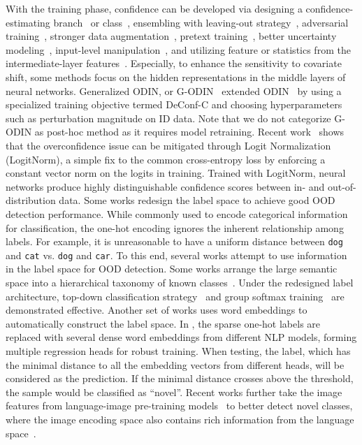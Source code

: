 With the training phase, confidence can be developed via designing a confidence-estimating branch~ or class~, ensembling with leaving-out strategy~, adversarial training~, stronger data augmentation~, pretext training~, better uncertainty modeling~, input-level manipulation~, and utilizing feature or statistics from the intermediate-layer features~. Especially, to enhance the sensitivity to covariate shift, some methods focus on the hidden representations in the middle layers of neural networks. Generalized ODIN, or G-ODIN~ extended ODIN~ by using a specialized training objective termed DeConf-C and choosing hyperparameters such as perturbation magnitude on ID data. Note that we do not categorize G-ODIN as post-hoc method as it requires model retraining. Recent work~ shows that the overconfidence issue can be mitigated through Logit Normalization (LogitNorm), a simple fix to the common cross-entropy loss by enforcing a constant vector norm on the logits in training. Trained with LogitNorm, neural networks produce highly distinguishable confidence scores between in- and out-of-distribution data.
Some works redesign the label space to achieve good OOD detection performance. While commonly used to encode categorical information for classification, the one-hot encoding ignores the inherent relationship among labels. For example, it is unreasonable to have a uniform distance between \texttt{dog} and \texttt{cat} vs. \texttt{dog} and \texttt{car}.
To this end, several works attempt to use information in the label space for OOD detection.
Some works arrange the large semantic space into a hierarchical taxonomy of known classes~.
Under the redesigned label architecture, top-down classification strategy~ and group softmax training~ are demonstrated effective. 
Another set of works uses word embeddings to automatically construct the label space.
In , the sparse one-hot labels are replaced with several dense word embeddings from different NLP models, forming multiple regression heads for robust training. When testing, the label, which has the minimal distance to all the embedding vectors from different heads, will be considered as the prediction. If the minimal distance crosses above the threshold, the sample would be classified as ``novel''.
Recent works further take the image features from language-image pre-training models~ to better detect novel classes, where the image encoding space also contains rich information from the language space~.

